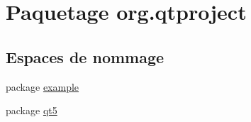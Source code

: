 \hypertarget{namespaceorg_1_1qtproject}{\section{Paquetage org.\-qtproject}
\label{namespaceorg_1_1qtproject}
}
\subsection*{Espaces de nommage}
\begin{DoxyCompactItemize}
\item 
package \hyperlink{namespaceorg_1_1qtproject_1_1example}{example}
\item 
package \hyperlink{namespaceorg_1_1qtproject_1_1qt5}{qt5}
\end{DoxyCompactItemize}
